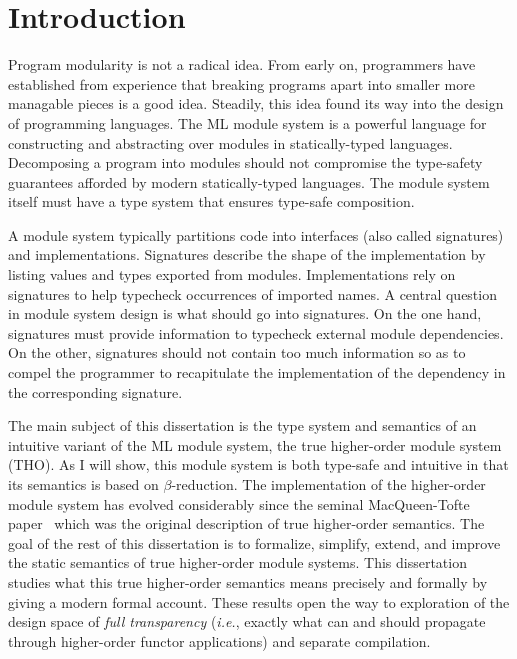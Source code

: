 

\chapter{Introduction}\label{ch:intro}

Program modularity is not a radical idea. From early on, programmers have established from experience that breaking programs apart into smaller more managable pieces is a good idea. Steadily, this idea found its way into the design of programming languages. The ML module system is a powerful language for constructing and abstracting over modules in statically-typed languages. Decomposing a program into modules should not compromise the type-safety guarantees afforded by modern statically-typed languages. The module system itself must have a type system that ensures type-safe composition. 

A module system typically partitions code into interfaces (also called signatures) and implementations. Signatures describe the shape of the implementation by listing values and types exported from modules. Implementations rely on signatures to help typecheck occurrences of imported names. A central question in module system design is what should go into signatures. On the one hand, signatures must provide information to typecheck external module dependencies. On the other, signatures should not contain too much information so as to compel the programmer to recapitulate the implementation of the dependency in the corresponding signature. 

The main subject of this dissertation is the type system and semantics of an intuitive variant of the ML module system, the true higher-order module system (THO). As I will show, this module system is both type-safe and intuitive in that its semantics is based on $\beta$-reduction. 
The implementation of the higher-order module system has evolved considerably since the seminal MacQueen-Tofte paper~\cite{mt94} which was the original description of true higher-order semantics. The goal of the rest of this dissertation is to formalize, simplify, extend, and improve the static semantics of true higher-order module systems. 
This dissertation studies what this true higher-order semantics means precisely and formally by giving a modern formal account. These results open the way to exploration of the design space of \emph{full transparency} (\emph{i.e.}, exactly what can and should propagate through higher-order functor applications) and separate compilation. 
	
